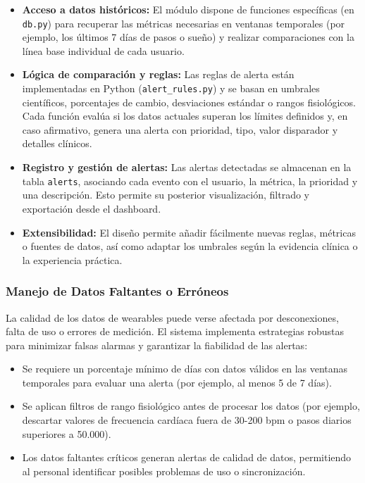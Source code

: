 \begin{itemize}
    \item \textbf{Acceso a datos históricos:} El módulo dispone de funciones específicas (en \texttt{db.py}) para recuperar las métricas necesarias en ventanas temporales (por ejemplo, los últimos 7 días de pasos o sueño) y realizar comparaciones con la línea base individual de cada usuario.
    \item \textbf{Lógica de comparación y reglas:} Las reglas de alerta están implementadas en Python (\texttt{alert\_rules.py}) y se basan en umbrales científicos, porcentajes de cambio, desviaciones estándar o rangos fisiológicos. Cada función evalúa si los datos actuales superan los límites definidos y, en caso afirmativo, genera una alerta con prioridad, tipo, valor disparador y detalles clínicos.
    \item \textbf{Registro y gestión de alertas:} Las alertas detectadas se almacenan en la tabla \texttt{alerts}, asociando cada evento con el usuario, la métrica, la prioridad y una descripción. Esto permite su posterior visualización, filtrado y exportación desde el dashboard.
    \item \textbf{Extensibilidad:} El diseño permite añadir fácilmente nuevas reglas, métricas o fuentes de datos, así como adaptar los umbrales según la evidencia clínica o la experiencia práctica.
\end{itemize}

\subsubsection{Manejo de Datos Faltantes o Erróneos}
La calidad de los datos de wearables puede verse afectada por desconexiones, falta de uso o errores de medición. El sistema implementa estrategias robustas para minimizar falsas alarmas y garantizar la fiabilidad de las alertas:
\begin{itemize}
    \item Se requiere un porcentaje mínimo de días con datos válidos en las ventanas temporales para evaluar una alerta (por ejemplo, al menos 5 de 7 días).
    \item Se aplican filtros de rango fisiológico antes de procesar los datos (por ejemplo, descartar valores de frecuencia cardíaca fuera de 30-200 bpm o pasos diarios superiores a 50.000).
    \item Los datos faltantes críticos generan alertas de calidad de datos, permitiendo al personal identificar posibles problemas de uso o sincronización.
\end{itemize}

